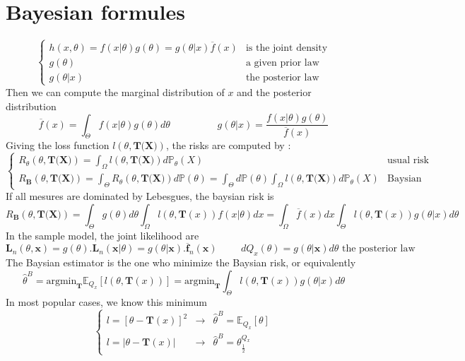 \documentclass[a4paper,10pt]{article}
\begin{document}
\section{Bayesian formules}
\[
\left\{
\begin{array}{ll}
h(x,\theta) = f(x|\theta)g(\theta) = g(\theta|x)\overline{f}(x)  & \text{is the joint density}  \\
g(\theta)   &\text{a given prior law }                                         \\ 
g(\theta|x) &\text{the posterior law }                            
\end{array}\right.
\]
Then we can compute the marginal distribution of $x$ and the posterior distribution 
\[
\overline{f}(x) = \int_{\Theta} f(x|\theta)g(\theta) d\theta
\hspace{2cm}
g(\theta|x) = \frac{ f(x|\theta)g(\theta) }{ \overline{f}(x) }
\]
Giving the loss function $l(\theta,\textbf{T(X)})$, the risks are computed by :
\[
\left\{
\begin{array}{ll}
R_{\theta}(\theta, \textbf{T(X)}) = \int_{\Omega} l(\theta,\textbf{T(X)}) d\mathbb{P}_{\theta}(X)  & \text{usual risk}  \\
R_{\textbf{B}}(\theta, \textbf{T(X)}) =   \int_{\Theta} R_{\theta}(\theta, \textbf{T(X)}) d\mathbb{P}(\theta) = 
\int_{\Theta} d\mathbb{P}(\theta) \int_{\Omega} l(\theta,\textbf{T(X)}) d\mathbb{P}_{\theta}(X)
& \text{Baysian risk} 
\end{array}\right.
\]
If all mesures are dominated by Lebesgues, the baysian risk is 
\[
R_{\textbf{B}}(\theta, \textbf{T(X)}) = \int_{\Theta} g(\theta) d\theta \int_{\Omega} l(\theta,\textbf{T}(x))   f(x|\theta) dx  
= \int_{\Omega}  \overline{f}(x) dx\int_{\Theta} l(\theta,\textbf{T}(x))  g(\theta|x) d\theta 
\]
In the sample model, the joint likelihood are
\[
\textbf{L}_n(\theta, \textbf{x}) = g(\theta).\textbf{L}_n(\textbf{x}|\theta) = g(\theta|\textbf{x}).\overline{\textbf{f}}_n(\textbf{x})
\hspace{1cm}
dQ_x(\theta) =  g(\theta|\textbf{x}) d\theta \text{ the posterior law}
\] 
The Baysian estimator is the one who minimize the Baysian risk, or equivalently
\[
\widehat{\theta}^{B} = \text{argmin}_{\textbf{T} } \mathbb{E}_{Q_x} [ l(\theta,\textbf{T}(x)) ]
=\text{argmin}_{\textbf{T} } \int_{\Theta} l(\theta,\textbf{T}(x))  g(\theta|x) d\theta 
\]
In most popular cases, we know this minimum
\[
\left\{
\begin{array}{lcl}
 l = [\theta-\textbf{T}(x)]^2  &\rightarrow& \widehat{\theta}^{B} =  \mathbb{E}_{Q_x}[\theta] \\
 l = |\theta-\textbf{T}(x)|    &\rightarrow& \widehat{\theta}^{B} =  \theta^{Q_x}_{\frac{1}{2}}
\end{array}\right.
\]
\end{document}

